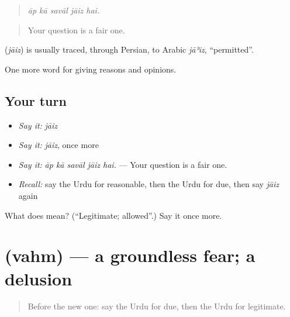 \begin{quote}
    
\end{quote}

\begin{quote}
\emph{āp kā savāl jāiz hai.}
\end{quote}

\begin{quote}
Your question is a fair one.
\end{quote}

\begin{cousinweb}
\textbf{} (\emph{jāiz}) is usually traced, through Persian, to Arabic \emph{jāʾiz}, \textquotedblleft{}permitted\textquotedblright{}.
\end{cousinweb}

\begin{grammarlens}[title={What you've built}]
One more word for giving reasons and opinions.
\end{grammarlens}

\subsection*{Your turn}
\begin{itemize}
\raggedright
  \item \emph{Say it:} \emph{jāiz}
  \item \emph{Say it:} \emph{jāiz}, once more
  \item \emph{Say it:} \emph{āp kā savāl jāiz hai.} — Your question is a fair one.
  \item \emph{Recall:} say the Urdu for reasonable, then the Urdu for due, then say \emph{jāiz} again
\end{itemize}

\begin{tcolorbox}[breakable,colback=teal!4,colframe=teal!35!black,title={Before you move on}]
What does  mean? (\textquotedblleft{}Legitimate; allowed\textquotedblright{}.) Say it once more.
\end{tcolorbox}
\section[\texorpdfstring{\ur{وہم} (vahm)}{وہم (vahm)}]{ (vahm) — a groundless fear; a delusion}

\label{lesson:UR-C354-vahm}



\begin{quote}
Before the new one: say the Urdu for due, then the Urdu for legitimate.
\end{quote}

